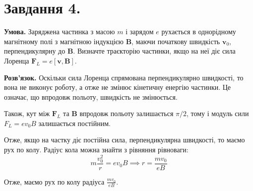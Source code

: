 \documentclass[12pt]{extarticle}
\begin{document}
\section*{Завдання 4.}

\textbf{Умова.} Заряджена частинка з масою $m$ і зарядом $e$ рухається в однорідному магнітному полі з магнітною індукцією $\mathbf{B}$, маючи початкову швидкість $\mathbf{v}_0$, перпендикулярну до $\mathbf{B}$. Визначте траєкторію частинки, якщо на неї діє сила Лоренца $\mathbf{F}_L = e[\mathbf{v},\mathbf{B}]$.

\textbf{Розв'язок.} Оскільки сила Лоренца спрямована перпендикулярно швидкості, то вона не виконує роботу, а отже не змінює кінетичну енергію частинки. Це означає, що впродовж польоту, швидкість не змінюється. 

Також, кут між $\mathbf{F}_L$ та $\mathbf{B}$ впродовж польоту залишається $\pi/2$, тому і модуль сили $F_L=ev_0B$ залишається постійним. 

Отже, якщо на частку діє постійна сила, перпендикулярна швидкості, то маємо рух по колу. Радіус кола можна знайти з рівняння рівноваги:
\[
m \frac{v_0^2}{r} = ev_0B \implies r = \frac{mv_0}{eB}
\]

Отже, маємо рух по колу радіуса $\frac{mv_0}{eB}$. 
\end{document}
